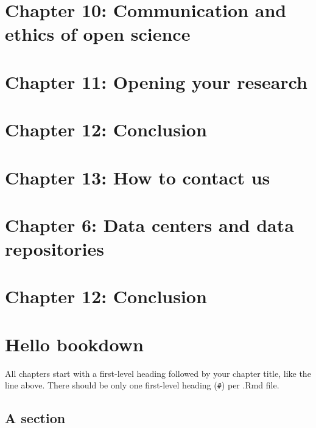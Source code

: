 \documentclass[
]{book}
\theoremstyle{definition}
\theoremstyle{definition}
\theoremstyle{definition}
\theoremstyle{definition}
\theoremstyle{remark}
\begin{document}
\hypertarget{chapter-10-communication-and-ethics-of-open-science}{%
\chapter{Chapter 10: Communication and ethics of open science}\label{chapter-10-communication-and-ethics-of-open-science}}

\hypertarget{chapter-11-opening-your-research}{%
\chapter{Chapter 11: Opening your research}\label{chapter-11-opening-your-research}}

\hypertarget{chapter-12-conclusion}{%
\chapter{Chapter 12: Conclusion}\label{chapter-12-conclusion}}

\hypertarget{chapter-13-how-to-contact-us}{%
\chapter{Chapter 13: How to contact us}\label{chapter-13-how-to-contact-us}}

\hypertarget{chapter-6-data-centers-and-data-repositories-1}{%
\chapter{Chapter 6: Data centers and data repositories}\label{chapter-6-data-centers-and-data-repositories-1}}

\hypertarget{chapter-12-conclusion-1}{%
\chapter{Chapter 12: Conclusion}\label{chapter-12-conclusion-1}}

\hypertarget{hello-bookdown}{%
\chapter{Hello bookdown}\label{hello-bookdown}}

All chapters start with a first-level heading followed by your chapter title, like the line above. There should be only one first-level heading (\texttt{\#}) per .Rmd file.

\hypertarget{a-section}{%
\section{A section}\label{a-section}}
\end{document}
